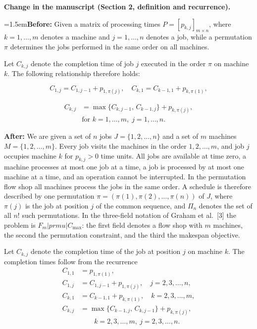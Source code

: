 \documentclass[12pt]{article}
\newcommand{\change}[3]{\par\smallskip\noindent\textbf{Change in the manuscript (#1).}\par
  {\leftskip=1.5em\noindent\textbf{Before:} #2\par\noindent\textbf{After:} #3\par}}
\begin{document}
\change{Section 2, definition and recurrence}{Given a matrix of processing times $P = [p_{k,j}]_{m \times n}$, where $k=1,\dots,m$ denotes a machine and $j=1,\dots,n$ denotes a job, while a permutation $\pi$ determines the jobs performed in the same order on all machines.

Let $C_{k,j}$ denote the completion time of job $j$ executed in the order $\pi$ on machine $k$. The following relationship therefore holds:

\begin{equation}
    C_{1,j} = C_{1,j-1} + p_{1,\pi(j)},\quad
    C_{k,1} = C_{k-1,1} + p_{k,\pi(1)},
\end{equation}

\begin{equation}
\begin{aligned}
C_{k,j} &= \max\{C_{k,j-1},\, C_{k-1,j}\} + p_{k,\pi(j)}, \\
        &\text{for } k=1,\dots,m,\; j=1,\dots,n.
\end{aligned}
\end{equation}}{We are given a set of $n$ jobs $J=\{1,2,\dots,n\}$ and a set of $m$ machines $M=\{1,2,\dots,m\}$. Every job visits the machines in the order $1,2,\dots,m$, and job $j$ occupies machine $k$ for $p_{k,j}>0$ time units. All jobs are available at time zero, a machine processes at most one job at a time, a job is processed by at most one machine at a time, and an operation cannot be interrupted. In the permutation flow shop all machines process the jobs in the same order. A schedule is therefore described by one permutation $\pi=(\pi(1),\pi(2),\dots,\pi(n))$ of $J$, where $\pi(j)$ is the job at position $j$ of the common sequence, and $\Pi_n$ denotes the set of all $n!$ such permutations. In the three-field notation of Graham et al.~[3] the problem is $F_m|prmu|C_{\max}$: the first field denotes a flow shop with $m$ machines, the second the permutation constraint, and the third the makespan objective.

Let $C_{k,j}$ denote the completion time of the job at position $j$ on machine $k$. The completion times follow from the recurrence
\begin{align}
C_{1,1} &= p_{1,\pi(1)}, \\
C_{1,j} &= C_{1,j-1}+p_{1,\pi(j)}, \quad j=2,3,\dots,n, \\
C_{k,1} &= C_{k-1,1}+p_{k,\pi(1)}, \quad k=2,3,\dots,m, \\
C_{k,j} &= \max\{C_{k-1,j},\,C_{k,j-1}\}+p_{k,\pi(j)}, \nonumber\\
&\qquad k=2,3,\dots,m,\ j=2,3,\dots,n. 
\end{align}}
\end{document}
